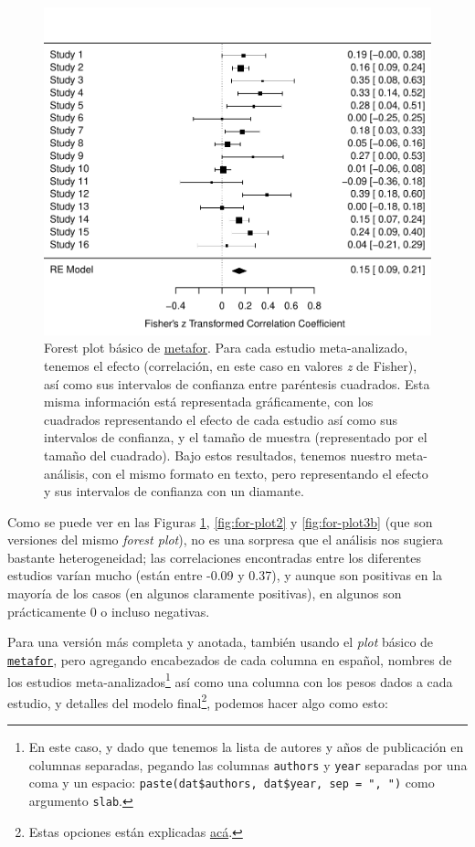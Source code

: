 \documentclass[
  bookmarksnumbered]{article}
\begin{document}
\begin{figure}
\centering
\includegraphics{Meta-analysis_files/figure-latex/for-plot1-1.pdf}
\caption{\label{fig:for-plot1}Forest plot básico de \href{https://www.metafor-project.org/doku.php}{metafor}. Para cada estudio meta-analizado, tenemos el efecto (correlación, en este caso en valores \emph{z} de Fisher), así como sus intervalos de confianza entre paréntesis cuadrados. Esta misma información está representada gráficamente, con los cuadrados representando el efecto de cada estudio así como sus intervalos de confianza, y el tamaño de muestra (representado por el tamaño del cuadrado). Bajo estos resultados, tenemos nuestro meta-análisis, con el mismo formato en texto, pero representando el efecto y sus intervalos de confianza con un diamante.}
\end{figure}

Como se puede ver en las Figuras \ref{fig:for-plot1}, \ref{fig:for-plot2} y \ref{fig:for-plot3b} (que son versiones del mismo \emph{forest plot}), no es una sorpresa que el análisis nos sugiera bastante heterogeneidad; las correlaciones encontradas entre los diferentes estudios varían mucho (están entre -0.09 y 0.37), y aunque son positivas en la mayoría de los casos (en algunos claramente positivas), en algunos son prácticamente 0 o incluso negativas.

Para una versión más completa y anotada, también usando el \emph{plot} básico de \href{https://www.metafor-project.org/doku.php}{\texttt{metafor}}, pero agregando encabezados de cada columna en español, nombres de los estudios meta-analizados\footnote{En este caso, y dado que tenemos la lista de autores y años de publicación en columnas separadas, pegando las columnas \texttt{authors} y \texttt{year} separadas por una coma y un espacio: \texttt{paste(dat\$authors,\ dat\$year,\ sep\ =\ ",\ ")} como argumento \texttt{slab}.} así como una columna con los pesos dados a cada estudio, y detalles del modelo final\footnote{Estas opciones están explicadas \href{https://search.r-project.org/CRAN/refmans/metafor/html/forest.rma.html}{acá}.}, podemos hacer algo como esto:
\end{document}
